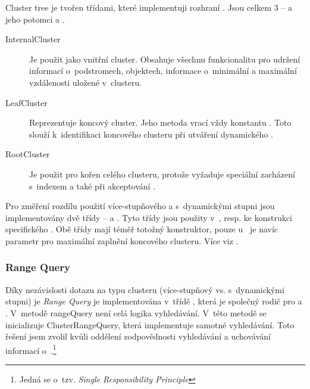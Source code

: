 Cluster tree je tvořen třídami, které implementuji rozhraní \linebreak {}. Jsou celkem 3 -- 
 a jeho potomci   a .

\begin{description}
\item[InternalCluster] Je použit jako vnitřní cluster. Obsahuje všechnu funkcionalitu pro udržení informací o~podstromech, objektech, informace o~minimální a maximální vzdálenosti uložené v~clusteru.
\item[LeafCluster] Reprezentuje koncový cluster. Jeho metoda \linebreak {} vrací vždy konstantu . Toto slouží k~identifikaci koncového clusteru při utváření dynamického .
\item[RootCluster] Je použit pro kořen celého clusteru, protože vyžaduje speciální zacházení s~indexem a také při akceptování .
\end{description}

Pro změření rozdílu použití více-stupňového  a  s~dynamickými stupni jsou implementovány dvě třídy -- \linebreak {} a \linebreak {}. Tyto třídy jsou použity v~, \linebreak resp.  ke konstrukci specifického .
Obě třídy mají téměř totožný konstruktor, pouze \linebreak u~ je navíc parametr pro maximální zaplnění koncového clusteru. Více viz .

\subsubsection{Range Query}
Díky nezávislosti dotazu na typu clusteru (více-stupňový vs. s~dynamickými stupni) je \emph{Range Query} je implementována v~třídě , která je společný rodič pro  a . V~metodě rangeQuery není celá logika vyhledávání. V~této metodě se inicializuje ClusterRangeQuery, která implementuje samotné vyhledávání. Toto řešení jsem zvolil kvůli oddělení zodpovědnosti vyhledávání a uchovávání informací o~.\footnote{Jedná se o~tzv. \emph{Single Responsibility Principle}\cite{martin2003agile}}

